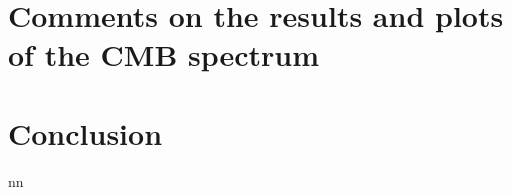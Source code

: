 \documentclass{article}
\begin{document}
\section{Comments on the results and plots of the CMB spectrum}







\section{Conclusion}
nn
\citep{padmanabhanDetectingDarkMatter2005}





\end{document}
